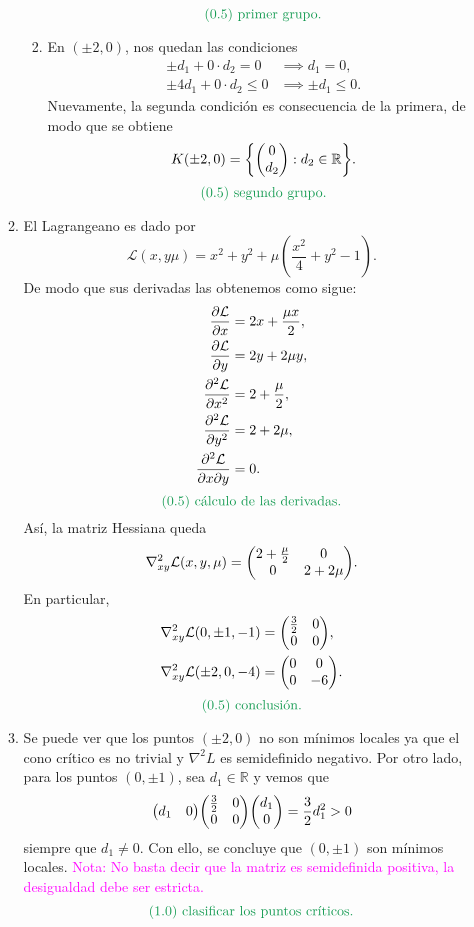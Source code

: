 \documentclass{article}
\begin{document}
\begin{enumerate}
\begin{enumerate}
\begin{enumerate}
\[				\]
				\[
					\text{\textcolor{ForestGreen}{(0.5) primer grupo.}}
				\]
			\item En \((\pm 2, 0)\), nos quedan las condiciones
				\begin{align*}
					\pm d_1 + 0 \cdot d_2 = 0 &\implies d_1 = 0, \\
					\pm 4d_1 + 0 \cdot d_2 \leq 0 &\implies \pm d_1 \leq 0.
				\end{align*}
				Nuevamente, la segunda condición es consecuencia de la primera, de modo que se obtiene
				\[
					K(\pm 2, 0) = \qty{\mqty(0 \\ d_2) : d_2 \in \mathbb{R}}.
				\]
				\[
					\text{\textcolor{ForestGreen}{(0.5) segundo grupo.}}
				\]
		\end{enumerate}
	\item El Lagrangeano es dado por
		\[
			\mathcal{L}(x, y \mu) = x^2 + y^2 + \mu \left(\frac{x^2}{4} + y^2 - 1\right).
		\]
		De modo que sus derivadas las obtenemos como sigue:
		\begin{align*}
			\pdv{\mathcal{L}}{x} &= 2x + \frac{\mu x}{2}, \\
			\pdv{\mathcal{L}}{y} &= 2y + 2\mu y, \\
			\pdv[2]{\mathcal{L}}{x} &= 2 + \frac{\mu}{2}, \\
			\pdv[2]{\mathcal{L}}{y} &= 2 + 2\mu, \\
			\frac{\partial^2 \mathcal{L}}{\partial x \partial y} &= 0.
		\end{align*}
		\[
			\text{\textcolor{ForestGreen}{(0.5) cálculo de las derivadas.}}
		\]
		Así, la matriz Hessiana queda
		\[
			\nabla^2_{xy}\mathcal{L}(x, y, \mu) = \mqty(2 + \frac{\mu}{2} & 0 \\ 0 & 2 + 2\mu).
		\]
		En particular,
		\begin{align*}
			\nabla^2_{xy}\mathcal{L}(0, \pm 1, -1) &= \mqty(\frac{3}{2} & 0 \\ 0 & 0), \\
			\nabla^2_{xy}\mathcal{L}(\pm 2, 0, -4) &= \mqty(0 & 0 \\ 0 & -6).
		\end{align*}
		\[
			\text{\textcolor{ForestGreen}{(0.5) conclusión.}}
		\]
	\item Se puede ver que los puntos \((\pm 2, 0)\) no son mínimos locales ya que el cono crítico es no trivial y \(\nabla^2 L\) es semidefinido negativo. Por otro lado, para los puntos \((0, \pm 1)\), sea \(d_1 \in \mathbb{R}\) y vemos que
		\[
			\mqty(d_1 & 0) \mqty(\frac{3}{2} & 0 \\ 0 & 0) \mqty(d_1 \\ 0) = \frac{3}{2} d_1^2 > 0
		\]
		siempre que \(d_1 \neq 0\). Con ello, se concluye que \((0, \pm 1)\) son mínimos locales. \textcolor{magenta}{Nota: No basta decir que la matriz es semidefinida positiva, la desigualdad debe ser estricta.}
		\[
			\text{\textcolor{ForestGreen}{(1.0) clasificar los puntos críticos.}}
		\]


\end{enumerate}
\end{enumerate}
\end{document}
